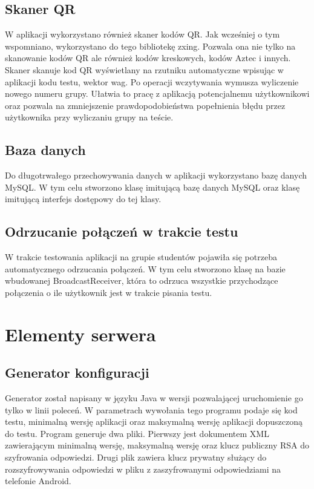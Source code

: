 \documentclass{report}
\begin{document}
		\section{Skaner QR}
		
		W aplikacji wykorzystano również skaner kodów QR. Jak wcześniej o tym wspomniano, wykorzystano do tego bibliotekę zxing. Pozwala ona nie tylko na skanowanie kodów QR ale również kodów kreskowych, kodów Aztec i innych. Skaner skanuje kod QR wyświetlany na rzutniku  automatyczne wpisując w aplikacji kodu testu, wektor wag. Po operacji wczytywania wymusza wyliczenie nowego numeru grupy. Ułatwia to pracę z aplikacją potencjalnemu użytkownikowi oraz pozwala na zmniejszenie prawdopodobieństwa popełnienia błędu przez użytkownika przy wyliczaniu grupy na teście.
		
		\section{Baza danych}
		
		Do długotrwałego przechowywania danych w aplikacji wykorzystano bazę danych MySQL. W tym celu stworzono klasę imitującą bazę danych MySQL oraz klasę imitującą interfejs dostępowy do tej klasy.
		
		\section{Odrzucanie połączeń w trakcie testu}
		
		W trakcie testowania aplikacji na grupie studentów pojawiła się potrzeba automatycznego odrzucania połączeń. W tym celu stworzono klasę na bazie wbudowanej BroadcastReceiver, która to odrzuca wszystkie przychodzące połączenia o ile użytkownik jest w trakcie pisania testu.
		
	\chapter{Elementy serwera}
		
		\section{Generator konfiguracji}
		
		Generator został napisany w języku Java w wersji pozwalającej uruchomienie go tylko w linii poleceń. W parametrach wywołania tego programu podaje się kod testu, minimalną wersję aplikacji oraz maksymalną wersję aplikacji dopuszczoną do testu. Program generuje dwa pliki. Pierwszy jest dokumentem XML zawierającym minimalną wersję, maksymalną wersję oraz klucz publiczny RSA do szyfrowania odpowiedzi. Drugi plik zawiera klucz prywatny służący do rozszyfrowywania odpowiedzi w pliku z zaszyfrowanymi odpowiedziami na telefonie Android.
		
\end{document}
